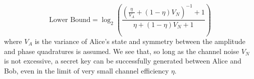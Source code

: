 \begin{refsection}
\begin{equation}
\text{Lower Bound}=\log_2\left(\frac{\left(\frac{\eta}{V_A}+\left(1-\eta\right)V_N\right)^{-1}+1}{\eta+\left(1-\eta\right)V_N+1}\right)
\end{equation}
where $V_A$ is the variance of Alice's state and symmetry between the amplitude and phase quadratures is assumed. We see that, so long as the channel noise $V_N$ is not excessive, a secret key can be successfully generated between Alice and Bob, even in the limit of very small channel efficiency $\eta$.  

\clearpage
\printbibliography[heading=subbibliography]
\end{refsection}
\cleardoublepage

